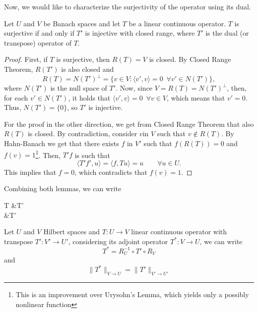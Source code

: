 Now, we would like to characterize the surjectivity of the operator using its dual.
\begin{lemma}
    Let $U$ and $V$ be Banach spaces and let $T$ be a linear continuous operator. $T$ is surjective if and only if $T'$ is injective with closed range, where $T'$ is the dual (or transpose) operator of $T$.

\begin{proof}
    First, if $T$ is surjective, then $R(T) = V$ is closed. By Closed Range Theorem, $R(T')$ is also closed and 
    \begin{equation}
        R(T) = N(T')^\bot = 
        \{v\in V: \langle v', v\rangle = 0 \,\,\, \forall v' \in N(T')\},
    \end{equation}
    where $N(T')$ is the null space of $T'$. Now, since
    $V = R(T) = N(T')^\bot$, then, for each $v' \in N(T')$, it holds
    that $ \langle v', v\rangle = 0\,\,\, \forall v \in V$, which means that $v' = 0$. Thus, $N(T') = \{0\}$, so $T'$ is injective.

    For the proof in the other direction, we get from Closed Range Theorem that also $R(T)$ is closed. By contradiction, consider $v$in $V$ such that $v\not\in R(T)$. By Hahn-Banach we get that there exists $f$ in $V'$ such that $f(R(T)) = 0$ and $f(v)=1$\footnote{This is an improvement over Urysohn's Lemma, which yields only a possibly nonlinear function}. Then, $T'f$ is such that
    \begin{equation*}
        \langle T'f', u\rangle = \langle f, Tu\rangle = u \qquad \forall u\in U.
    \end{equation*}
    This implies that $f=0$, which contradicts that $f(v)=1$. 
    \end{proof}
\end{lemma}
Combining both lemmas, we can write
\begin{tightalign*}
    T 
    &\Longleftrightarrow T'
    \\&\Longleftrightarrow T'
\end{tightalign*}
Let $U$ and $V$ Hilbert spaces and $T:U\to V$ linear continuous operator with transpose $T':V'\to U'$, considering its adjoint operator $T^*:V \to U$, we can write 
\begin{equation}
    T^* = R_U^{-1} \circ T' \circ R_V
\end{equation} 
and 
\begin{equation}
    \| T^* \|_{V\to U} = \| T' \|_{V'\to U'}
\end{equation} 
